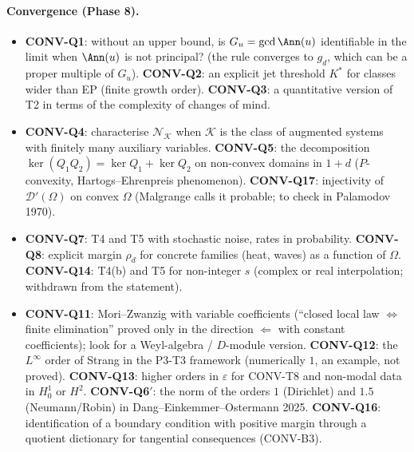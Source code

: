 \paragraph{Convergence (Phase 8).}
\begin{itemize}
\item \textbf{CONV-Q1}: without an upper bound, is $G_u=\gcd\Ann(u)$ identifiable in the limit when $\Ann(u)$ is not principal? (the rule converges to $g_d$, which can be a proper multiple of $G_u$). \textbf{CONV-Q2}: an explicit jet threshold $K^*$ for classes wider than EP (finite growth order). \textbf{CONV-Q3}: a quantitative version of T2 in terms of the complexity of changes of mind.
\item \textbf{CONV-Q4}: characterise $\mathcal N_{\mathcal K}$ when $\mathcal K$ is the class of augmented systems with finitely many auxiliary variables. \textbf{CONV-Q5}: the decomposition $\ker(Q_1Q_2)=\ker Q_1+\ker Q_2$ on non-convex domains in $1+d$ ($P$-convexity, Hartogs--Ehrenpreis phenomenon). \textbf{CONV-Q17}: injectivity of $\mathcal D'(\Omega)$ on convex $\Omega$ (Malgrange calls it probable; to check in Palamodov 1970).
\item \textbf{CONV-Q7}: T4 and T5 with stochastic noise, rates in probability. \textbf{CONV-Q8}: explicit margin $\rho_d$ for concrete families (heat, waves) as a function of $\Omega$. \textbf{CONV-Q14}: T4(b) and T5 for non-integer $s$ (complex or real interpolation; withdrawn from the statement).
\item \textbf{CONV-Q11}: Mori--Zwanzig with variable coefficients (``closed local law $\iff$ finite elimination'' proved only in the direction $\Leftarrow$ with constant coefficients); look for a Weyl-algebra / $D$-module version. \textbf{CONV-Q12}: the $L^\infty$ order of Strang in the P3-T3 framework (numerically $1$, an example, not proved). \textbf{CONV-Q13}: higher orders in $\varepsilon$ for CONV-T8 and non-modal data in $H^1_0$ or $H^2$. \textbf{CONV-Q6$'$}: the norm of the orders $1$ (Dirichlet) and $1.5$ (Neumann/Robin) in Dang--Einkemmer--Ostermann 2025. \textbf{CONV-Q16}: identification of a boundary condition with positive margin through a quotient dictionary for tangential consequences (CONV-B3).
\end{itemize}

